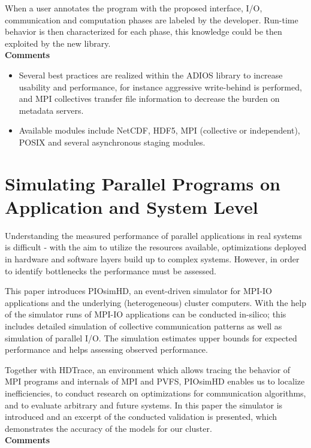 \documentclass[a4paper,14pt]{extarticle}
\newcommand{\espaco}{\hspace{16pt}}
\begin{document}
When a user annotates the program with the proposed interface, I/O, communication and computation
phases are labeled by the developer. Run-time behavior is then characterized for each phase, this knowledge
could be then exploited by the new library.\\[1cm]

{\bf \large Comments} 

\begin{itemize}

\item Several best practices are realized within the ADIOS library to increase usability and performance, for instance aggressive write-behind is performed, and MPI collectives transfer file information to decrease the burden on metadata servers.

\item Available modules include NetCDF, HDF5, MPI (collective or independent), POSIX and several asynchronous staging modules.

\end{itemize}

\clearpage

\section{Simulating Parallel Programs on Application and System Level}

\espaco
Understanding the measured performance
of parallel applications in real systems is difficult - with
the aim to utilize the resources available, optimizations
deployed in hardware and software layers build up to
complex systems. However, in order to identify bottlenecks the performance must be assessed.

This paper introduces PIOsimHD, an event-driven
simulator for MPI-IO applications and the underlying
(heterogeneous) cluster computers. With the help of
the simulator runs of MPI-IO applications can be conducted in-silico; this includes detailed simulation of collective communication patterns as well as simulation of
parallel I/O. The simulation estimates upper bounds
for expected performance and helps assessing observed
performance.

Together with HDTrace, an environment which allows tracing the behavior of MPI programs and internals of MPI and PVFS, PIOsimHD enables us to localize inefficiencies, to conduct research on optimizations
for communication algorithms, and to evaluate arbitrary and future systems. In this paper the simulator is
introduced and an excerpt of the conducted validation
is presented, which demonstrates the accuracy of the
models for our cluster.\\[1cm]

{\bf \large Comments} 

\clearpage
\end{document}
